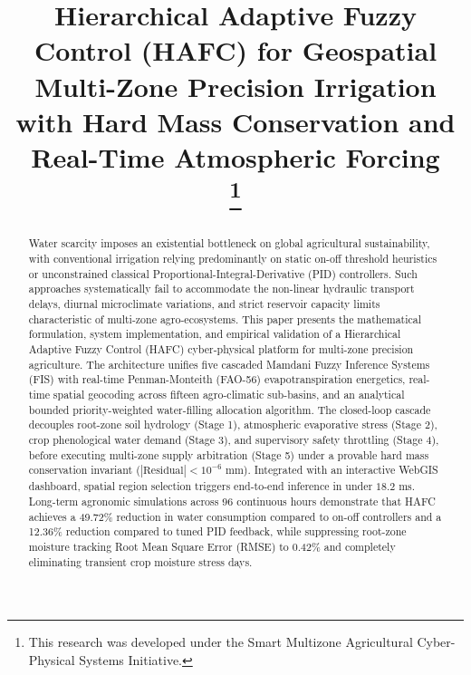 \documentclass[conference]{IEEEtran}
\begin{document}
\title{Hierarchical Adaptive Fuzzy Control (HAFC) for Geospatial Multi-Zone Precision Irrigation with Hard Mass Conservation and Real-Time Atmospheric Forcing\\
\thanks{This research was developed under the Smart Multizone Agricultural Cyber-Physical Systems Initiative.}
}

\author{
\and
{}
}

\maketitle

\begin{abstract}
Water scarcity imposes an existential bottleneck on global agricultural sustainability, with conventional irrigation relying predominantly on static on-off threshold heuristics or unconstrained classical Proportional-Integral-Derivative (PID) controllers. Such approaches systematically fail to accommodate the non-linear hydraulic transport delays, diurnal microclimate variations, and strict reservoir capacity limits characteristic of multi-zone agro-ecosystems. This paper presents the mathematical formulation, system implementation, and empirical validation of a Hierarchical Adaptive Fuzzy Control (HAFC) cyber-physical platform for multi-zone precision agriculture. The architecture unifies five cascaded Mamdani Fuzzy Inference Systems (FIS) with real-time Penman-Monteith (FAO-56) evapotranspiration energetics, real-time spatial geocoding across fifteen agro-climatic sub-basins, and an analytical bounded priority-weighted water-filling allocation algorithm. The closed-loop cascade decouples root-zone soil hydrology (Stage 1), atmospheric evaporative stress (Stage 2), crop phenological water demand (Stage 3), and supervisory safety throttling (Stage 4), before executing multi-zone supply arbitration (Stage 5) under a provable hard mass conservation invariant ($|\text{Residual}| < 10^{-6}\text{ mm}$). Integrated with an interactive WebGIS dashboard, spatial region selection triggers end-to-end inference in under $18.2\text{ ms}$. Long-term agronomic simulations across 96 continuous hours demonstrate that HAFC achieves a 49.72\% reduction in water consumption compared to on-off controllers and a 12.36\% reduction compared to tuned PID feedback, while suppressing root-zone moisture tracking Root Mean Square Error (RMSE) to 0.42\% and completely eliminating transient crop moisture stress days.
\end{abstract}
\end{document}
